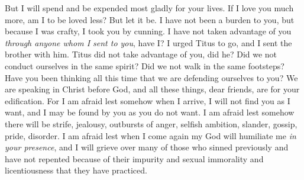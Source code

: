 \begin{biblechapter}
\verse But I will spend and be expended most gladly for your lives. If I love you much more, am I to be loved less?
\verse But let it be. I have not been a burden to you, but because I was crafty, I took you by cunning.
\verse I have not taken advantage of you \textit{through anyone whom I sent to you}, have I?
\verse I urged Titus to go, and I sent the brother with him. Titus did not take advantage of you, did he? Did we not conduct ourselves in the same spirit? Did we not walk in the same footsteps?
\verse Have you been thinking all this time that we are defending ourselves to you? We are speaking in Christ before God, and all these things, dear friends, are for your edification.
\verse For I am afraid lest somehow when I arrive, I will not find you as I want, and I may be found by you as you do not want. I am afraid lest somehow there will be strife, jealousy, outbursts of anger, selfish ambition, slander, gossip, pride, disorder.
\verse I am afraid lest when I come again my God will humiliate me \textit{in your presence}, and I will grieve over many of those who sinned previously and have not repented because of their impurity and sexual immorality and licentiousness that they have practiced.
\end{biblechapter}

